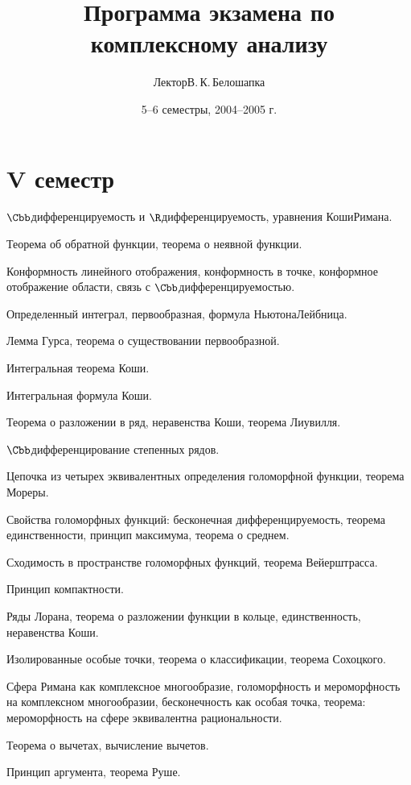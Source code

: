 \documentclass[a4paper]{article}
\title{Программа экзамена по  комплексному анализу}
\author{Лектор\т В.\,К.\,Белошапка}
\date{5--6 семестры, 2004--2005 г.}
\begin{document}
\maketitle

\section*{V семестр}

\begin{nums}{-2}
\item $\Cbb$\д дифференцируемость и $\R$\д дифференцируемость, уравнения Коши\ч Римана.
\item Теорема об обратной функции,  теорема о неявной функции.
\item Конформность линейного отображения, конформность в точке, конформное отображение области,
      связь с $\Cbb$\д дифференцируемостью.
\item Определенный интеграл, первообразная, формула Ньютона\ч Лейбница.
\item Лемма Гурса, теорема о существовании первообразной.
\item Интегральная теорема Коши.
\item Интегральная формула Коши.
\item Теорема о разложении в ряд, неравенства Коши, теорема Лиувилля.
\item $\Cbb$\д дифференцирование степенных рядов.
\item Цепочка из четырех эквивалентных определения голоморфной функции, теорема Мореры.
\item Свойства голоморфных функций: бесконечная дифференцируемость, теорема единственности,
      принцип максимума, теорема о среднем.
\item Сходимость в пространстве голоморфных функций, теорема Вейерштрасса.
\item Принцип компактности.
\item Ряды Лорана, теорема о разложении  функции в кольце, единственность, неравенства Коши.
\item Изолированные особые точки, теорема о классификации, теорема Сохоцкого.
\item Сфера Римана как комплексное многообразие, голоморфность и мероморфность на комплексном
      многообразии, бесконечность как особая точка,  теорема: мероморфность на сфере эквивалентна рациональности.
\item Теорема о вычетах, вычисление вычетов.
\item Принцип аргумента, теорема Руше.

\end{nums}
\end{document}
